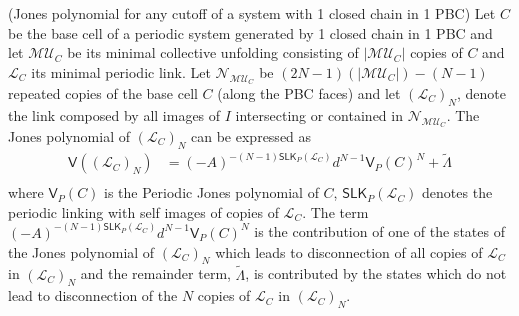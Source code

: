 \documentclass[10pt,a4paper]{amsart}
\begin{document}
\begin{theorem} (Jones polynomial for any cutoff of a system with 1 closed chain in 1 PBC)
Let $C$ be the base cell of a periodic system generated by 1 closed chain in 1 PBC and let $\mathcal{MU}_C$ be its minimal collective unfolding consisting of $|\mathcal{MU}_C|$ copies of $C$ and $\mathcal{L}_C$ its minimal periodic link. Let $\mathcal{N}_{\mathcal{MU}_C}$ be $(2N-1)( |\mathcal{MU}_C|) - (N-1)$ repeated copies of the base cell $C$ (along the PBC faces) and let $(\mathcal{L}_{C})_N$, denote the link composed by all images of $I$ intersecting or contained in $\mathcal{N}_{\mathcal{MU}_C}$.  The Jones polynomial of $(\mathcal{L}_C)_{N}$ can be expressed as
\begin{equation}
    \begin{split}\displaystyle
        \mathsf{V}\left((\mathcal{L}_C)_{N}\right)  &=(-A)^{-(N-1)\mathsf{SLK}_P(\mathcal{L}_C)} d^{N-1} {\mathsf{V}_P(C)}^N + \tilde{\Lambda}\\
    \end{split}
    \label{VHN-exp}
\end{equation}
\noindent where ${\mathsf{V}_P(C)}$ is the Periodic Jones polynomial of $C$, $\mathsf{SLK}_P(\mathcal{L}_C)$ denotes the periodic linking with self images of copies of $\mathcal{L}_C$. The term $(-A)^{-(N-1)\mathsf{SLK}_P(\mathcal{L}_C)} d^{N-1} {\mathsf{V}_P(C)}^N$ is the contribution of one of the states of the Jones polynomial of $(\mathcal{L}_C)_{N}$ which leads to disconnection of all copies of $\mathcal{L}_{C}$ in $(\mathcal{L}_{C})_N$ and the remainder term, $\tilde{\Lambda}$, is contributed by the states which do not lead to disconnection of the $N$ 
 copies of $\mathcal{L}_{C}$ in $(\mathcal{L}_{C})_N$.
\label{corr1PBCjones}
\end{theorem}
\end{document}
